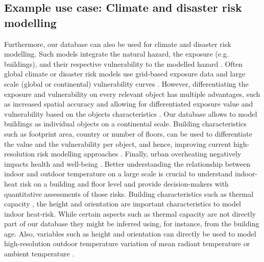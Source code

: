 \documentclass[fleqn,10pt]{wlscirep}
\begin{document}
\subsection*{Example use case: Climate and disaster risk modelling} 
Furthermore, our database can also be used for climate and disaster risk modelling. Such models integrate the natural hazard, the exposure (e.g. buildings), and their respective vulnerability to the modelled hazard \cite{aznar2019climada}. Often global climate or disaster risk models use grid-based exposure data \cite{eberenz2020asset} and large scale (global or continental) vulnerability curves \cite{eberenz2020regional}. However, differentiating the exposure and vulnerability on every relevant object has multiple advantages, such as increased spatial accuracy and allowing for differentiated exposure value and vulnerability based on the objects characteristics \cite{van2021flood}. Our database allows to model buildings as individual objects on a continental scale. Building characteristics such as footprint area, country or number of floors, can be used to differentiate the value and the vulnerability per object, and hence, improving current high-resolution risk modelling approaches \cite{stalhandske2022projected}. Finally, urban overheating negatively impacts health and well-being \cite{nazarian2022integrated}. Better understanding the relationship between indoor and outdoor temperature on a large scale is crucial to understand indoor-heat risk on a building and floor level and provide decision-makers with quantitative assessments of those risks. Building characteristics such as thermal capacity \cite{buchin2016role}, the height and orientation are important characteristics to model indoor heat-risk. While certain aspects such as thermal capacity are not directly part of our database they might be inferred using, for instance, from the building age. Also, variables such as height and orientation can directly be used to model high-resolution outdoor temperature variation of mean radiant temperature \cite{lindberg2008solweig} or ambient temperature \cite{zumwald2021mapping}.  
\end{document}

